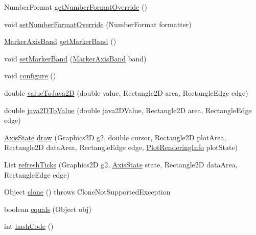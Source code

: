 \begin{DoxyCompactItemize}
\item 
Number\+Format \mbox{\hyperlink{classorg_1_1jfree_1_1chart_1_1axis_1_1_number_axis_a0a7a84fa0f916b12d3f1605f6e6ea394}{get\+Number\+Format\+Override}} ()
\item 
void \mbox{\hyperlink{classorg_1_1jfree_1_1chart_1_1axis_1_1_number_axis_aa30f98a9e8ab585366f8cbe3bf4f6edf}{set\+Number\+Format\+Override}} (Number\+Format formatter)
\item 
\mbox{\hyperlink{classorg_1_1jfree_1_1chart_1_1axis_1_1_marker_axis_band}{Marker\+Axis\+Band}} \mbox{\hyperlink{classorg_1_1jfree_1_1chart_1_1axis_1_1_number_axis_a5a439c05a6192b3760772f680d307bd9}{get\+Marker\+Band}} ()
\item 
void \mbox{\hyperlink{classorg_1_1jfree_1_1chart_1_1axis_1_1_number_axis_a5ce1751ba25aa3c1860c63d3c10603a9}{set\+Marker\+Band}} (\mbox{\hyperlink{classorg_1_1jfree_1_1chart_1_1axis_1_1_marker_axis_band}{Marker\+Axis\+Band}} band)
\item 
void \mbox{\hyperlink{classorg_1_1jfree_1_1chart_1_1axis_1_1_number_axis_a9ce5dc230912397f2eb7a52803aced73}{configure}} ()
\item 
double \mbox{\hyperlink{classorg_1_1jfree_1_1chart_1_1axis_1_1_number_axis_aca5ccf90ff36f2b8f09170fac7fd10f9}{value\+To\+Java2D}} (double value, Rectangle2D area, Rectangle\+Edge edge)
\item 
double \mbox{\hyperlink{classorg_1_1jfree_1_1chart_1_1axis_1_1_number_axis_af7fbc7cfa74ffab183a5e4780b58d730}{java2\+D\+To\+Value}} (double java2\+D\+Value, Rectangle2D area, Rectangle\+Edge edge)
\item 
\mbox{\hyperlink{classorg_1_1jfree_1_1chart_1_1axis_1_1_axis_state}{Axis\+State}} \mbox{\hyperlink{classorg_1_1jfree_1_1chart_1_1axis_1_1_number_axis_a2ed1acf2d3ad0a40af90b0ea341f6a46}{draw}} (Graphics2D g2, double cursor, Rectangle2D plot\+Area, Rectangle2D data\+Area, Rectangle\+Edge edge, \mbox{\hyperlink{classorg_1_1jfree_1_1chart_1_1plot_1_1_plot_rendering_info}{Plot\+Rendering\+Info}} plot\+State)
\item 
List \mbox{\hyperlink{classorg_1_1jfree_1_1chart_1_1axis_1_1_number_axis_a6c16a5db620b1782e259e8d095aaa145}{refresh\+Ticks}} (Graphics2D g2, \mbox{\hyperlink{classorg_1_1jfree_1_1chart_1_1axis_1_1_axis_state}{Axis\+State}} state, Rectangle2D data\+Area, Rectangle\+Edge edge)
\item 
Object \mbox{\hyperlink{classorg_1_1jfree_1_1chart_1_1axis_1_1_number_axis_af175ffb380db044f3c4a307dfa5575ef}{clone}} ()  throws Clone\+Not\+Supported\+Exception 
\item 
boolean \mbox{\hyperlink{classorg_1_1jfree_1_1chart_1_1axis_1_1_number_axis_ae1eb488604571a95032af3c53e91d265}{equals}} (Object obj)
\item 
int \mbox{\hyperlink{classorg_1_1jfree_1_1chart_1_1axis_1_1_number_axis_acbf178f91cfc8f49182236b5f1873265}{hash\+Code}} ()
\end{DoxyCompactItemize}
